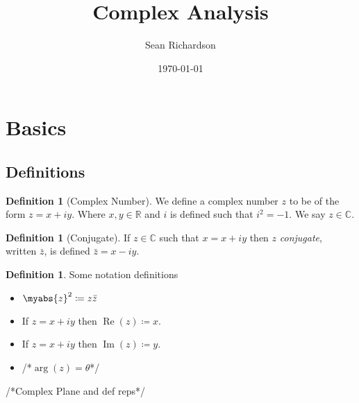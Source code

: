 \documentclass[11pt]{article}
\theoremstyle{definition}
\newtheorem{definition}[theorem]{Definition}
\DeclareMathOperator{\re}{Re}
\DeclareMathOperator{\im}{Im}
\begin{document}
\title{Complex Analysis}
\author{Sean Richardson}
\date{\today}
\maketitle

\section{Basics}

\subsection{Definitions}
\begin{definition}[Complex Number]
We define a complex number $z$ to be of the form $z=x+iy$. Where $x,y \in
\mathbb{R}$ and $i$ is defined such that $i^2=-1$. We say $z \in
\mathbb{C}$.
\end{definition}
\begin{definition}[Conjugate]
    If $z \in \mathbb{C}$ such that $x = x+iy$ then $z$ \emph{conjugate}, written $\bar{z}$, is
    defined $\bar{z} = x-iy$.
\end{definition}
\begin{definition} Some notation definitions
    \begin{itemize}
        \item $\myabs{z}^2 \coloneqq  z\bar{z}$
        \item If $z = x+iy$ then $\re(z) \coloneqq x$.
        \item If $z = x+iy$ then $\im(z) \coloneqq y$.
        \item /*$\arg(z) = \theta$*/
    \end{itemize}
\end{definition}
/*Complex Plane and def reps*/
\end{document}
